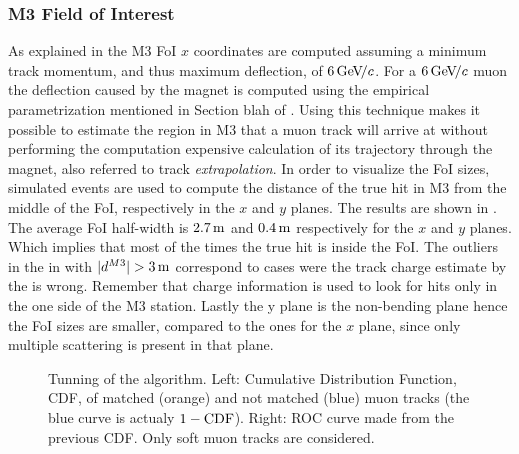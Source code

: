 \subsubsection{M3 Field of Interest}
As explained in  the M3 FoI $x$ coordinates are computed assuming a minimum track momentum, and thus maximum deflection,
of $6{\mathrm{\,Ge\kern -0.1em V\!/}c}$. For a $6{\mathrm{\,Ge\kern -0.1em V\!/}c}$ muon the deflection caused by the \lhcb magnet is computed using the empirical parametrization mentioned in Section blah of \cite{roelThesis}.
Using this technique makes it possible to estimate the region in M3 that a muon track will arrive at without performing the computation
expensive calculation of its trajectory through the \lhcb magnet, also referred to track {\it extrapolation}. In order to visualize the FoI sizes,
simulated events are used to compute the distance of the true hit in M3 from the middle of the FoI, respectively in the $x$ and $y$ planes.
The results are shown in . The average FoI half-width is $2.7\rm \,m$ and $0.4\rm \,m$ respectively for the $x$ and $y$ planes.
Which implies that most of the times the true hit is inside the FoI. The outliers in the  in with $|d^{M3}|>3\m$
correspond to cases were the track charge estimate by the \ttracker is wrong. Remember that charge information is used to
look for hits only in the one side of the M3 station. Lastly the y plane is the non-bending plane hence the FoI sizes
are smaller, compared to the ones for the $x$ plane, since only multiple scattering is present in that plane.

\begin{figure}[t]
  \centering
  \begin{subfigure}{0.5\textwidth}
    \raggedright
    \scalebox{0.6}{}
    \caption{}
    \label{mvm_cdf}
  \end{subfigure}%
  \hfill%
  \begin{subfigure}{0.5\textwidth}
    \raggedleft
    \scalebox{0.6}{}
    \caption{}
    \label{mvm_roc}
  \end{subfigure}
  \caption{Tunning of the \mvTTm algorithm. Left: \chisq Cumulative Distribution Function, CDF,
           of matched (orange) and not matched (blue) muon tracks (the blue curve is actualy $1-{\rm CDF}$).
           Right: ROC curve made from the previous \chisq CDF. Only soft muon tracks are considered. }
 \label{mvm_tuning}
\end{figure}

